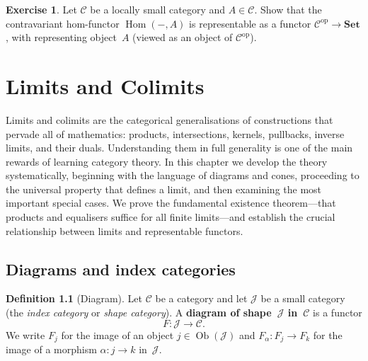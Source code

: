 \documentclass[a4paper,12pt]{book}
\DeclareMathOperator{\Hom}{Hom}
\DeclareMathOperator{\Ob}{Ob}
\newcommand{\Set}{\mathbf{Set}}
\newcommand{\op}{\mathrm{op}}
\theoremstyle{definition}
\newtheorem{definition}{Definition}[section]
\newtheorem{exercise}[definition]{Exercise}
\theoremstyle{plain}
\theoremstyle{remark}
\begin{document}
\begin{exercise}\label{exo:representable-dual}
Let $\mathcal{C}$ be a locally small category and $A\in\mathcal{C}$.
Show that the contravariant hom-functor $\Hom(-,A)$ is representable
as a functor $\mathcal{C}^{\op}\to\Set$, with representing object~$A$
(viewed as an object of $\mathcal{C}^{\op}$).
\end{exercise}



\chapter{Limits and Colimits}\label{ch:limits-colimits}
\minitoc

\vspace{1em}

Limits and colimits are the categorical generalisations of constructions
that pervade all of mathematics: products, intersections, kernels,
pullbacks, inverse limits, and their duals.  Understanding them in full
generality is one of the main rewards of learning category theory.
In this chapter we develop the theory systematically, beginning with the
language of diagrams and cones, proceeding to the universal property that
defines a limit, and then examining the most important special cases.
We prove the fundamental existence theorem---that products and equalisers
suffice for all finite limits---and establish the crucial relationship
between limits and representable functors.


\section{Diagrams and index categories}\label{sec:diagrams}

\begin{definition}[Diagram]\label{def:diagram}
Let $\mathcal{C}$ be a category and let $\mathcal{J}$ be a small category
(the \emph{index category} or \emph{shape category}).
A \textbf{diagram of shape~$\mathcal{J}$ in~$\mathcal{C}$} is a functor
\[
    F \colon \mathcal{J} \longrightarrow \mathcal{C}.
\]
We write $F_j$ for the image of an object $j \in \Ob(\mathcal{J})$
and $F_\alpha \colon F_j \to F_k$ for the image of a morphism
$\alpha \colon j \to k$ in~$\mathcal{J}$.
\end{definition}
\end{document}
